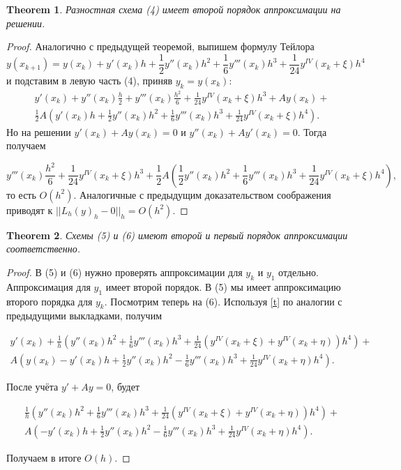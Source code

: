 \documentclass[12 pt, russian]{article}
\newtheorem{theo}{Theorem}[section]
\newcommand\beq{\begin{equation}}
\newcommand\eeq{\end{equation}}
\begin{document}
\begin{theo}
Разностная схема (4) имеет второй порядок аппроксимации на решении.
\end{theo}
\begin{proof}
Аналогично с предыдущей теоремой, выпишем формулу Тейлора 
\beq
\label{t}
y(x_{k+1}) = y(x_k) + y'(x_k) h + \frac{1}{2} y''(x_k) h^2 + \frac{1}{6} y'''(x_k ) h^3 + \frac{1}{24} y^{IV}(x_k + \xi) h^4
\eeq
 и подставим в левую часть (4), приняв $y_k = y(x_k)$:
\begin{multline}
y'(x_k) + y''(x_k) \frac{h}{2} + y'''(x_k) \frac{h^2}{6} + \frac{1}{24} y^{IV}(x_k + \xi) h^3 + A y(x_k) + \\  \frac{1}{2} A ( y'(x_k) h + \frac{1}{2} y''(x_k) h^2 +\frac{1}{6} y'''(x_k ) h^3 + \frac{1}{24} y^{IV}(x_k + \xi) h^4).
\end{multline}
Но на решении $y'(x_k) + Ay(x_k) = 0$ и $y''(x_k) + Ay'(x_k) = 0$. Тогда получаем 

\beq
y'''(x_k) \frac{h^2}{6} + \frac{1}{24} y^{IV}(x_k + \xi) h^3 + \frac{1}{2} A (\frac{1}{2} y''(x_k) h^2 +\frac{1}{6} y'''(x_k ) h^3 + \frac{1}{24} y^{IV}(x_k + \xi) h^4), 
\eeq
то есть $O(h^2)$. Аналогичные с предыдущим доказательством соображения приводят к  $||L_h (y)_h - 0||_h = O(h^2)$.
\end{proof}

\begin{theo}
Схемы (5) и (6) имеют второй и первый порядок аппроксимации соответственно.
\end{theo}
\begin{proof}
В (5) и (6) нужно проверять аппроксимации для $y_k$ и $y_1$ отдельно. Аппроксимация для $y_1$ имеет второй порядок. В (5) мы имеет аппроксимацию второго порядка для $y_k$. Посмотрим теперь на (6). Используя \ref{t} по аналогии с предыдущими выкладками, получим

\begin{multline}
y'(x_k) + \frac{1}{h}( y''(x_k)  h^2 + \frac{1}{6} y'''(x_k) h^3 + \frac{1}{24} (y^{IV}(x_k + \xi) +  y^{IV}(x_k + \eta)) h^4) +\\ A(y(x_k) - y'(x_k) h + \frac{1}{2} y''(x_k) h^2 - \frac{1}{6} y'''(x_k ) h^3 + \frac{1}{24} y^{IV}(x_k + \eta) h^4).
\end{multline}

После учёта $y' + Ay = 0$, будет

\begin{multline}
 \frac{1}{h}( y''(x_k)  h^2 + \frac{1}{6} y'''(x_k) h^3 + \frac{1}{24} (y^{IV}(x_k + \xi) +  y^{IV}(x_k + \eta)) h^4) +\\ A(- y'(x_k) h + \frac{1}{2} y''(x_k) h^2 - \frac{1}{6} y'''(x_k ) h^3 + \frac{1}{24} y^{IV}(x_k + \eta) h^4).
\end{multline}

Получаем в итоге $O(h)$.

\end{proof}
\end{document}

